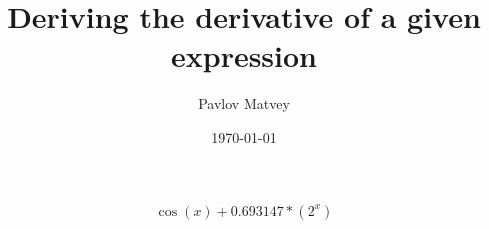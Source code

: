 \documentclass[12pt, letterpaper]{article}
\title {Deriving the derivative of a given expression}
\author{Pavlov Matvey}
\date{\today}
\begin{document}
\maketitle
\[\cos(x)+0.693147*(2^x)\]
\end{document}
